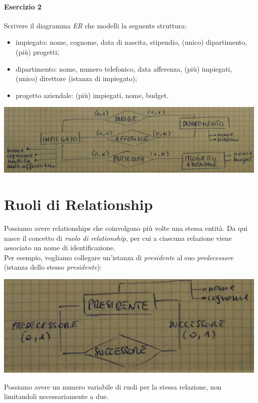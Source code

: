 \paragraph{Esercizio 2}
Scrivere il diagramma \textit{ER} che modelli la seguente struttura:
\begin{itemize}
    \item impiegato: nome, cognome, data di nascita, stipendio, (unico) dipartimento, (più) progetti;
    \item dipartimento: nome, numero telefonico, data afferenza, (più) impiegati, (unico) direttore (istanza di impiegato);
    \item progetto aziendale: (più) impiegati, nome, budget.
\end{itemize}
\begin{center}
    \includegraphics[width=.7\textwidth]{res/er-impiegato-dipartimento-progettoaziendale.jpg} \hfill
\end{center}

\section{Ruoli di Relationship}
Possiamo avere relationships che coinvolgono più volte una stessa entità. Da qui nasce il concetto di \textit{ruolo di relationship}, per cui a ciascuna relazione viene associato un nome di identificazione. \\
Per esempio, vogliamo collegare un'istanza di \textit{presidente} al suo \textit{predecessore} (istanza dello stesso \textit{presidente}):
\begin{center}
    \includegraphics[width=.7\textwidth]{res/er-presidente.jpg} \hfill
\end{center}
Possiamo avere un numero variabile di ruoli per la stessa relazione, non limitandoli necessariamente a due.

